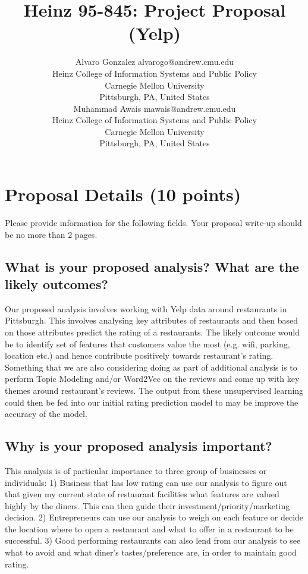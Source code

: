 \documentclass[twoside,11pt]{article}
\begin{document}
\title{Heinz 95-845: Project Proposal (Yelp)}

\author{\name Alvaro Gonzalez \email alvarogo@andrew.cmu.edu \\
       \addr Heinz College of Information Systems and Public Policy\\
       Carnegie Mellon University\\
       Pittsburgh, PA, United States \\
       \AND
       \name Muhammad Awais \email mawais@andrew.cmu.edu \\
       \addr Heinz College of Information Systems and Public Policy\\
       Carnegie Mellon University\\
       Pittsburgh, PA, United States}
\maketitle



\section{Proposal Details (10 points)} \label{details}
Please provide information for the following fields. Your proposal write-up should be no more than 2 pages.

\subsection{What is your proposed analysis? What are the likely outcomes?}
Our proposed analysis involves working with Yelp data around restaurants in Pittsburgh. This involves analysing key attributes of restaurants and then based on those attributes predict the rating of a restaurants. The likely outcome would be to identify set of features that customers value the most (e.g. wifi, parking, location etc.) and hence contribute positively towards restaurant's rating. Something that we are also considering doing as part of additional analysis is to perform Topic Modeling and/or Word2Vec on the reviews and come up with key themes around restaurant's reviews. The output from these unsupervised learning could then be fed into our initial rating prediction model to may be improve the accuracy of the model.  

\subsection{Why is your proposed analysis important?}
This analysis is of particular importance to three group of businesses or individuals: 1) Business that has low rating can use our analysis to figure out that given my current state of restaurant facilities what features are valued highly by the diners. This can then guide their investment/priority/marketing decision. 2) Entrepreneurs can use our analysis to weigh on each feature or decide the location where to open a restaurant and what to offer in a restaurant to be successful. 3) Good performing restaurants can also lend from our analysis to see what to avoid and what diner's tastes/preference are, in order to maintain good rating.  
\end{document}
